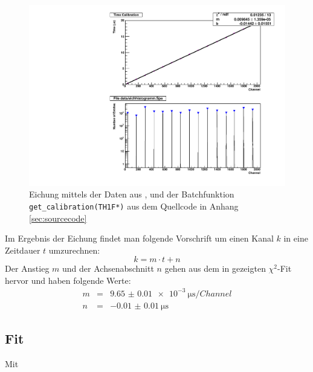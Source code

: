 \begin{figure}[ht!]
  \centering
  \includegraphics[width=\columnwidth,keepaspectratio=true]{eichungkalibration}
  \caption{Eichung mittels der Daten aus ,  und der Batchfunktion \texttt{get\_calibration(TH1F*)} aus dem Quellcode in Anhang \ref{sec:sourcecode}}
  \label{fig:eichungkalibration}
\end{figure}

Im Ergebnis der Eichung findet man folgende Vorschrift um einen Kanal $k$ in
eine Zeitdauer $t$ umzurechnen:
\begin{equation}
  k = m \cdot t + n
\end{equation}
Der Anstieg $m$ und der Achsenabschnitt $n$ gehen aus dem in 
gezeigten $\chi^2$-Fit hervor und haben folgende Werte:
\begin{eqnarray}
  m &=& \SI{9.65(1)e-3}{\micro\second\per{Channel}} \\
  n &=& \SI{-0.01(1)}{\micro\second}
\end{eqnarray}

\subsection{Fit}

Mit

